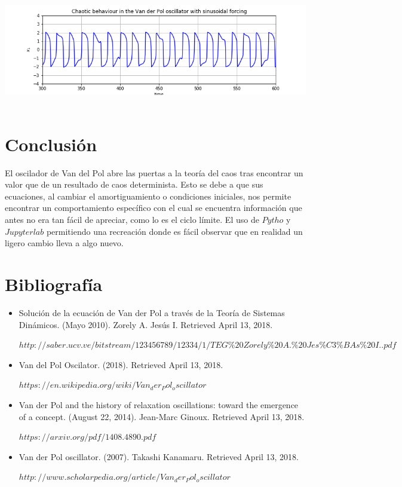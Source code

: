 \documentclass{article}
\begin{document}
	\begin{center}
    \includegraphics[height=5cm]{Image4.png}
    \end{center}

\section{Conclusión}
El oscilador de Van del Pol abre las puertas a la teoría del caos tras encontrar un valor que de un resultado de caos determinista. Esto se debe a que sus ecuaciones, al cambiar el amortiguamiento o condiciones iniciales, nos permite encontrar un comportamiento específico con el cual se encuentra información que antes no era tan fácil de apreciar, como lo es el ciclo límite. El uso de $Pytho$ y $Jupyter lab$ permitiendo una recreación donde es fácil observar que en realidad un ligero cambio lleva a algo nuevo.



\section{Bibliografía}
\begin{itemize}
\item Solución de la ecuación de Van der Pol a través de la Teoría de Sistemas Dinámicos. (Mayo 2010). Zorely A. Jesús I. Retrieved April 13, 2018.

$http://saber.ucv.ve/bitstream/123456789/12334/1/TEG \% 20Zorely \% 20A. \% 20Jes \% C3 \% BAs \% 20I..pdf$

\item Van del Pol Oscilator. (2018). Retrieved April 13, 2018.

$https://en.wikipedia.org/wiki/Van_der_Pol_oscillator$

\item Van der Pol and the history of relaxation oscillations: toward the emergence of a concept. (August 22, 2014). Jean-Marc Ginoux. Retrieved April 13, 2018.

$https://arxiv.org/pdf/1408.4890.pdf$

\item Van der Pol oscillator. (2007). Takashi Kanamaru. Retrieved April 13, 2018.

$http://www.scholarpedia.org/article/Van_der_Pol_oscillator$

\end{itemize}
\end{document}
